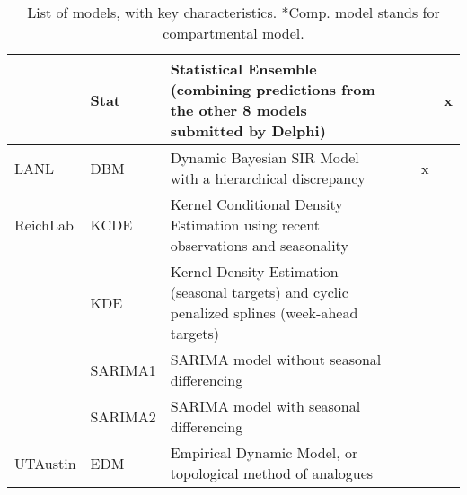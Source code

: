 \begin{table}
\begin{tabular}{p{1.69cm} l p{7.5cm}  p{1.1cm}  p{1.1cm} p{1.1cm}}
~        & Stat               & Statistical Ensemble (combining predictions from the other 8 models submitted by Delphi) & ~             & ~  & x                 \\
\hline
LANL     & DBM                & Dynamic Bayesian SIR Model with a hierarchical discrepancy & ~             & x      &              \\ 
\hline
ReichLab & KCDE               & Kernel Conditional Density Estimation using recent observations and seasonality  & ~             & ~            &        \\ 
~        & KDE                & Kernel Density Estimation (seasonal targets) and cyclic penalized splines (week-ahead targets)  & ~             & ~     &               \\ 
~        & SARIMA1            & SARIMA model without seasonal differencing & ~             & ~      &              \\ 
~        & SARIMA2            & SARIMA model with seasonal differencing & ~             & ~           &         \\ 
\hline
UTAustin & EDM                & Empirical Dynamic Model, or topological method of analogues & ~             & ~         &           \\ 
\end{tabular}
\caption{List of models, with key characteristics. *Comp. model stands for compartmental model.}
\label{tab:model-list}
\end{table}
